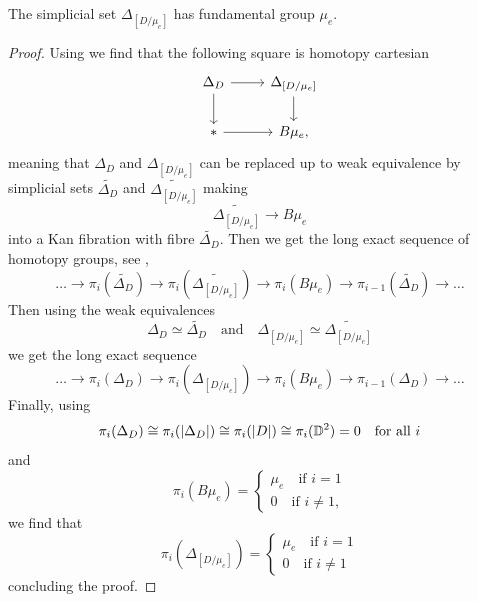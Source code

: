 \begin{rmk} \label{fundamental group of homotopy quotient}
The simplicial set $\Delta_{[D / \mu_e]}$ has fundamental group $\mu_e$.
\end{rmk}
\begin{proof}
Using \cite[\S IV Lemma 5.7]{SimplicialHomotopyTheory} we find that the following square is homotopy cartesian
\begin{equation}
\begin{tikzcd}
	{\Delta_D} & {\Delta_{[D / \mu_e]}} \\
	{*} & {B\mu_e,}
	\arrow[from=1-1, to=1-2]
	\arrow[from=1-1, to=2-1]
	\arrow[from=1-2, to=2-2]
	\arrow[from=2-1, to=2-2]
\end{tikzcd}
\end{equation}
meaning that $\Delta_D$ and $\Delta_{[D / \mu_e]}$ can be replaced up to weak equivalence by simplicial sets $\widetilde{\Delta_D}$ and $\widetilde{\Delta_{[D / \mu_e]}}$ making
\begin{equation}
\widetilde{\Delta_{[D / \mu_e]}} \to B\mu_e
\end{equation}
into a Kan fibration with fibre $\widetilde{\Delta_D}$. Then we get the long exact sequence of homotopy groups, see \cite[\S I Lemma 7.3]{SimplicialHomotopyTheory},
\begin{equation}
\dots \to \pi_i(\widetilde{\Delta_D}) \to \pi_i(\widetilde{\Delta_{[D/\mu_e]}}) \to \pi_i(B \mu_e) \to \pi_{i-1}(\widetilde{\Delta_D}) \to \dots
\end{equation}
Then using the weak equivalences
\begin{equation}
\Delta_D \simeq \widetilde{\Delta_D} \quad \text{and} \quad \Delta_{[D/\mu_e]} \simeq \widetilde{\Delta_{[D/\mu_e]}}
\end{equation}
we get the long exact sequence
\begin{equation}
\dots \to \pi_i(\Delta_D) \to \pi_i(\Delta_{[D/\mu_e]}) \to \pi_i(B \mu_e) \to \pi_{i-1}(\Delta_D) \to \dots
\end{equation}
Finally, using
\begin{equation}
\pi_i(\Delta_D) \cong \pi_i(|\Delta_D|) \cong \pi_i(|D|) \cong \pi_i(\mathbb{D}^2) = 0 \quad \text{for all } i
\end{equation}
and
\begin{equation}
\pi_i(B\mu_e) =
\begin{cases}
\mu_e \quad \text{if } i=1\\
0 \quad \text{if } i \neq 1,
\end{cases}
\end{equation}
we find that
\begin{equation}
\pi_i(\Delta_{[D/\mu_e]}) =
\begin{cases}
\mu_e \quad \text{if } i=1\\
0 \quad \text{if } i \neq 1
\end{cases}
\end{equation}
concluding the proof.
\end{proof}

